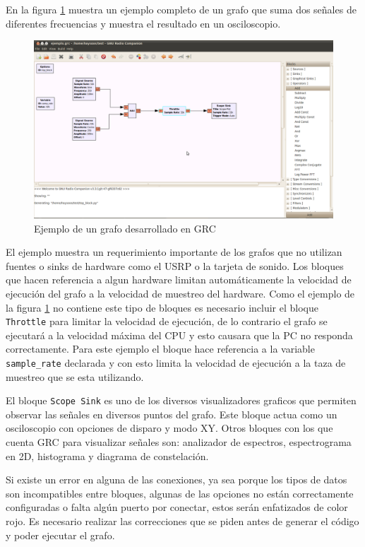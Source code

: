 En la figura \ref{fig:grcex} muestra un ejemplo completo de un grafo que suma dos se\~nales de
diferentes frecuencias y muestra el resultado en un osciloscopio.

\begin{figure}[tp]
  \centering
  \includegraphics[width=5.5in]{figs/grc6}
  \vspace{0.3in}
  \caption{Ejemplo de un grafo desarrollado en GRC}
  \label{fig:grcex}
\end{figure}

El ejemplo muestra un requerimiento importante de los grafos que no utilizan fuentes o sinks de
hardware como el USRP o la tarjeta de sonido. Los bloques que hacen referencia a algun hardware
limitan autom\'aticamente la velocidad de ejecuci\'on del grafo a la velocidad de muestreo del
hardware. Como el ejemplo de la figura \ref{fig:grcex} no contiene este tipo de bloques es
necesario incluir el bloque \verb|Throttle| para limitar la velocidad de ejecuci\'on, de lo
contrario el grafo se ejecutar\'a a la velocidad m\'axima del CPU y esto causara que la PC no
responda correctamente. Para este ejemplo el bloque hace referencia a la variable \verb|sample_rate|
declarada y con esto limita la velocidad de ejecuci\'on a la taza de muestreo que se esta utilizando.

El bloque \verb|Scope Sink| es uno de los diversos visualizadores graficos que permiten observar las
se\~nales en diversos puntos del grafo. Este bloque actua como un osciloscopio con opciones de
disparo y modo XY. Otros bloques con los que cuenta GRC para visualizar se\~nales son: analizador de
espectros, espectrograma en 2D, histograma y diagrama de constelaci\'on.

Si existe un error en alguna de las conexiones, ya sea porque los tipos de datos son incompatibles
entre bloques, algunas de las opciones no est\'an correctamente configuradas o falta alg\'un puerto
por conectar, estos ser\'an enfatizados de color rojo. Es necesario realizar las correcciones que se
piden antes de generar el c\'odigo y poder ejecutar el grafo.

